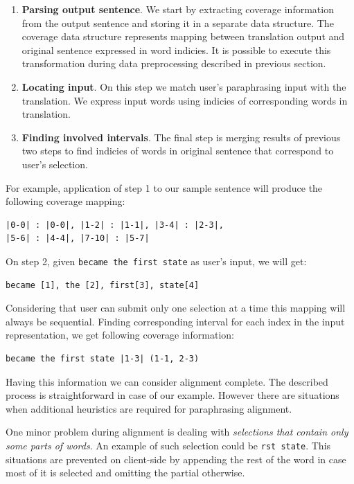 \begin{enumerate}
  \item \textbf{Parsing output sentence}. We start by extracting coverage information from the output sentence and storing it in a separate data structure. The coverage data structure represents mapping between translation output and original sentence expressed in word indicies. It is possible to execute this transformation during data preprocessing described in previous section. 
  \item \textbf{Locating input}. On this step we match user's paraphrasing input with the translation. We express input words using indicies of corresponding words in translation.
  \item \textbf{Finding involved intervals}. The final step is merging results of previous two steps to find indicies of words in original sentence that correspond to user's selection. 
\end{enumerate}

For example, application of step 1 to our sample sentence will produce the following coverage mapping:

\begin{verbatim}
|0-0| : |0-0|, |1-2| : |1-1|, |3-4| : |2-3|, 
|5-6| : |4-4|, |7-10| : |5-7|
\end{verbatim}

On step 2, given \texttt{became the first state} as user's input, we will get:

\begin{verbatim}
became [1], the [2], first[3], state[4]
\end{verbatim}

Considering that user can submit only one selection at a time this mapping will always be sequential.
Finding corresponding interval for each index in the input representation, we get following coverage information:

\begin{verbatim}
became the first state |1-3| (1-1, 2-3) 
\end{verbatim}

Having this information we can consider alignment complete. The described process is straightforward in case of our example. However there are situations when additional heuristics are required for paraphrasing alignment.

One minor problem during alignment is dealing with \emph{selections that contain only some parts of words}. An example of such selection could be \texttt{rst state}. This situations are prevented on client-side by appending the rest of the word in case most of it is selected and omitting the partial otherwise.


